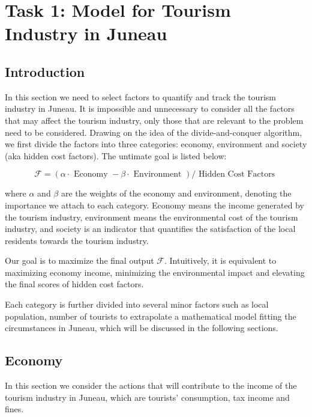 \section{Task 1: Model for Tourism Industry in Juneau}

\subsection{Introduction}


In this section we need to select factors to quantify and track the tourism industry in Juneau. 
It is impossible and unnecessary to consider all the factors that may affect the 
tourism industry, only those that are relevant to the problem need to be considered.
Drawing on the idea of the divide-and-conquer algorithm, we first divide the factors 
into three categories: economy, environment and society (aka hidden cost factors). 
The untimate goal is listed below:


\begin{equation}
    \mathcal{F}=(\alpha \cdot \text { Economy }-\beta \cdot \text { Environment }) / \text { Hidden Cost Factors }
\end{equation}

where $\alpha$ and $\beta$ are the weights of the economy and environment, denoting the importance we attach to each category.
Economy means the income generated by the tourism industry, environment means the environmental cost of the tourism industry, and 
society is an indicator that quantifies the satisfaction of the local residents towards the tourism industry.

Our goal is to maximize the final output $\mathcal{F}$. Intuitively, it 
is equivalent to maximizing economy income, minimizing the environmental 
impact and elevating the final scores of hidden cost factors.

Each category is further divided into several minor factors such as local population, 
number of tourists to extrapolate a mathematical model fitting the circumstances in Juneau,
which will be discussed in the following sections.





\subsection{Economy}

In this section we consider the actions that will contribute to the income of the tourism industry in Juneau, which are
tourists' consumption, tax income and fines.

